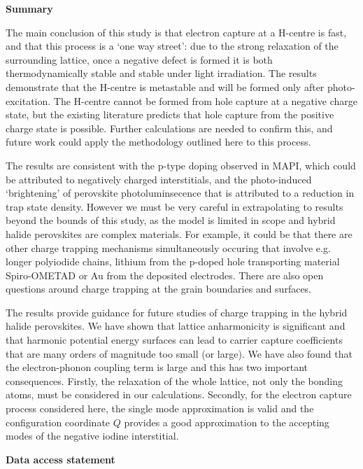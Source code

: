 \textbf{Summary}

The main conclusion of this study is that electron capture at a H-centre is fast, and that this process is a `one way street': due to the strong relaxation of the surrounding lattice, once a negative defect is formed it is both thermodynamically stable and stable under light irradiation.
The results demonstrate that the H-centre is metastable and will be formed only after photo-excitation. The H-centre cannot be formed from hole capture at a negative charge state, but the existing literature predicts that hole capture from the positive charge state is possible. Further calculations are needed to confirm this, and future work could apply the methodology outlined here to this process. 

The results are consistent with the p-type doping observed in MAPI, which could be attributed to negatively charged interstitials,\autocite{Li2018} and the photo-induced `brightening' of perovskite photoluminsecence that is attributed to a reduction in trap state density.\autocite{dequilettes2016}
However we must be very careful in extrapolating to results beyond the bounds of this study,
as the model is limited in scope and hybrid halide perovskites are complex materials. 
For example, it could be that there are other charge trapping mechanisms simultaneously occuring that involve e.g. longer polyiodide chains, lithium from the p-doped hole transporting material Spiro-OMETAD or Au from the deposited electrodes. There are also open questions around charge trapping at the grain boundaries and surfaces.\autocite{Chen2019}

The results provide guidance for future studies of charge trapping in the hybrid halide perovskites.
We have shown that lattice anharmonicity is significant and that harmonic potential energy surfaces can lead to carrier capture coefficients that are many orders of magnitude too small (or large).
We have also found that the electron-phonon coupling term is large and this has two important consequences. Firstly, the relaxation of the whole lattice, not only the bonding atoms, must be considered in our calculations.
Secondly, for the electron capture process considered here, the single mode approximation is valid and the configuration coordinate $Q$ provides a good approximation to the accepting modes of the negative iodine interstitial.

\textbf{Data access statement}

